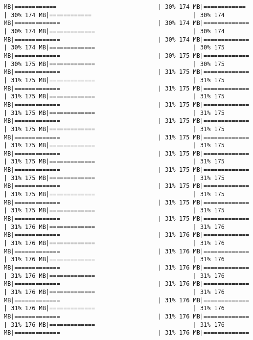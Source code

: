 \documentclass[
]{article}
\begin{document}
\begin{verbatim}
MB|============                             | 30% 174 MB|============                             | 30% 174 MB|============                             | 30% 174 MB|=============                            | 30% 174 MB|=============                            | 30% 174 MB|=============                            | 30% 174 MB|=============                            | 30% 174 MB|=============                            | 30% 174 MB|=============                            | 30% 175 MB|=============                            | 30% 175 MB|=============                            | 30% 175 MB|=============                            | 30% 175 MB|=============                            | 31% 175 MB|=============                            | 31% 175 MB|=============                            | 31% 175 MB|=============                            | 31% 175 MB|=============                            | 31% 175 MB|=============                            | 31% 175 MB|=============                            | 31% 175 MB|=============                            | 31% 175 MB|=============                            | 31% 175 MB|=============                            | 31% 175 MB|=============                            | 31% 175 MB|=============                            | 31% 175 MB|=============                            | 31% 175 MB|=============                            | 31% 175 MB|=============                            | 31% 175 MB|=============                            | 31% 175 MB|=============                            | 31% 175 MB|=============                            | 31% 175 MB|=============                            | 31% 175 MB|=============                            | 31% 175 MB|=============                            | 31% 175 MB|=============                            | 31% 175 MB|=============                            | 31% 175 MB|=============                            | 31% 175 MB|=============                            | 31% 175 MB|=============                            | 31% 175 MB|=============                            | 31% 175 MB|=============                            | 31% 175 MB|=============                            | 31% 176 MB|=============                            | 31% 176 MB|=============                            | 31% 176 MB|=============                            | 31% 176 MB|=============                            | 31% 176 MB|=============                            | 31% 176 MB|=============                            | 31% 176 MB|=============                            | 31% 176 MB|=============                            | 31% 176 MB|=============                            | 31% 176 MB|=============                            | 31% 176 MB|=============                            | 31% 176 MB|=============                            | 31% 176 MB|=============                            | 31% 176 MB|=============                            | 31% 176 MB|=============                            | 31% 176 MB|=============                            | 31% 176 MB|=============                            | 31% 176 MB|=============                            | 31% 176 MB|=============                            | 31% 176 MB|=============                            | 31% 176 MB|=============         
\end{verbatim}
\end{document}
